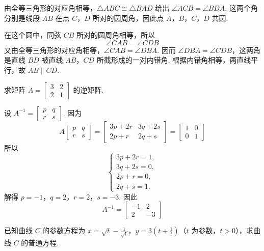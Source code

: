 \begin{solution}
由全等三角形的对应角相等，\(\triangle ABC\cong\triangle BAD\) 给出 \(\angle ACB=\angle BDA\). 这两个角分别是线段 \(AB\) 在点 \(C\)，\(D\) 所对的圆周角，因此点 \(A\)，\(B\)，\(C\)，\(D\) 共圆.

在这个圆中，同弦 \(CB\) 所对的圆周角相等，所以
\[
\angle CAB=\angle CDB
\]
又由全等三角形的对应角相等，\(\angle CAB=\angle DBA\). 因而 \(\angle DBA=\angle CDB\)，这两角是直线 \(BD\) 被直线 \(AB\)，\(CD\) 所截形成的一对内错角. 根据内错角相等，两直线平行，故 \(AB\parallel CD\).
\end{solution}

\reuseproblemnumber
\begin{problem}[B]
求矩阵 \(A=\begin{bmatrix}3&2\\2&1\end{bmatrix}\) 的逆矩阵.
\end{problem}

\begin{solution}
设 \(A^{-1}=\begin{bmatrix}p&q\\r&s\end{bmatrix}\). 因为
\[
A\begin{bmatrix}p&q\\r&s\end{bmatrix}
=\begin{bmatrix}3p+2r&3q+2s\\2p+r&2q+s\end{bmatrix}
=\begin{bmatrix}1&0\\0&1\end{bmatrix}
\]
所以
\[
\begin{cases}
3p+2r=1,\\
3q+2s=0,\\
2p+r=0,\\
2q+s=1.
\end{cases}
\]
解得 \(p=-1\)，\(q=2\)，\(r=2\)，\(s=-3\). 因此
\[
A^{-1}=\begin{bmatrix}-1&2\\2&-3\end{bmatrix}
\]
\end{solution}

\reuseproblemnumber
\begin{problem}[C]
已知曲线 \(C\) 的参数方程为 \(x=\sqrt t-\frac{1}{\sqrt t}\)，\(y=3\left(t+\frac1t\right)\)（\(t\) 为参数，\(t>0\)），求曲线 \(C\) 的普通方程.
\end{problem}

